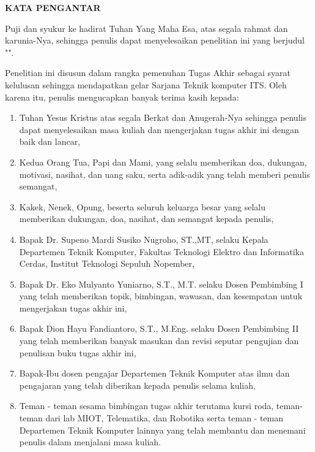 \begin{center}
  \Large
  \textbf{KATA PENGANTAR}
\end{center}


\vspace{2ex}


Puji dan syukur ke hadirat Tuhan Yang Maha Esa, atas segala rahmat dan karunia-Nya,
sehingga penulis dapat menyelesaikan penelitian ini yang berjudul
"\tatitle".

Penelitian ini disusun dalam rangka pemenuhan Tugas Akhir sebagai syarat kelulusan sehingga mendapatkan gelar Sarjana Teknik komputer ITS. Oleh karena itu, penulis mengucapkan banyak terima kasih kepada:

\begin{enumerate}[nolistsep]
  \item Tuhan Yesus Kristus atas segala Berkat dan Anugerah-Nya sehingga penulis dapat menyelesaikan masa kuliah dan mengerjakan tugas akhir ini dengan baik dan lancar,

  \item Kedua Orang Tua, Papi dan Mami, yang selalu memberikan doa, dukungan, motivasi, nasihat, dan uang saku, serta adik-adik yang telah memberi penulis semangat,
  
  \item Kakek, Nenek, Opung, beserta seluruh keluarga besar yang selalu memberikan dukungan, doa, nasihat, dan semangat kepada penulis,

  \item Bapak Dr. Supeno Mardi Susiko Nugroho, ST.,MT, selaku Kepala Departemen Teknik Komputer, Fakultas Teknologi Elektro dan Informatika Cerdas, Institut Teknologi Sepuluh Nopember,

  \item Bapak Dr. Eko Mulyanto Yuniarno, S.T., M.T. selaku Dosen Pembimbing I yang telah memberikan topik, bimbingan, wawasan, dan kesempatan untuk mengerjakan tugas akhir ini,

  \item Bapak Dion Hayu Fandiantoro, S.T., M.Eng. selaku Dosen Pembimbing II yang telah memberikan banyak masukan dan revisi seputar pengujian dan penulisan buku tugas akhir ini,

  \item Bapak-Ibu dosen pengajar Departemen Teknik Komputer atas ilmu dan pengajaran yang telah diberikan kepada penulis selama kuliah,
  
  \item Teman - teman sesama bimbingan tugas akhir terutama kursi roda, teman-teman dari lab MIOT, Telematika, dan Robotika serta teman - teman Departemen Teknik Komputer lainnya yang telah membantu dan menemani penulis dalam menjalani masa kuliah.

\end{enumerate}

